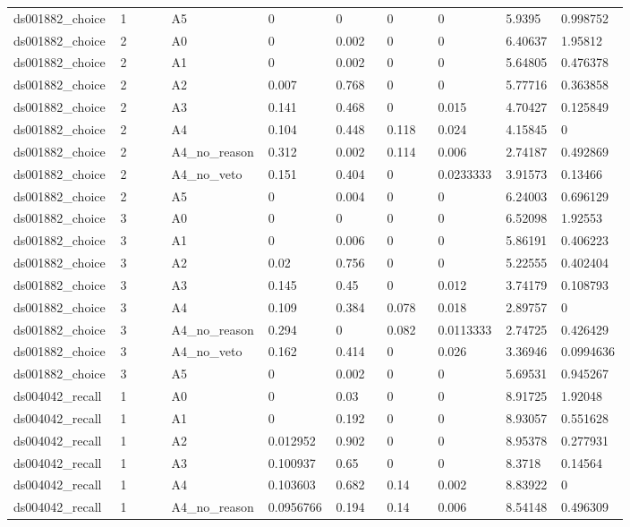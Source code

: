\documentclass[11pt]{article}
\begin{document}
\begin{landscape}
\begin{longtable}{@{}L{0.120\linewidth}L{0.085\linewidth}L{0.085\linewidth}L{0.085\linewidth}L{0.085\linewidth}L{0.085\linewidth}L{0.085\linewidth}L{0.085\linewidth}L{0.085\linewidth}@{}}
ds001882\_choice & 1 & A5 & 0 & 0 & 0 & 0 & 5.9395 & 0.998752 \\
ds001882\_choice & 2 & A0 & 0 & 0.002 & 0 & 0 & 6.40637 & 1.95812 \\
ds001882\_choice & 2 & A1 & 0 & 0.002 & 0 & 0 & 5.64805 & 0.476378 \\
ds001882\_choice & 2 & A2 & 0.007 & 0.768 & 0 & 0 & 5.77716 & 0.363858 \\
ds001882\_choice & 2 & A3 & 0.141 & 0.468 & 0 & 0.015 & 4.70427 & 0.125849 \\
ds001882\_choice & 2 & A4 & 0.104 & 0.448 & 0.118 & 0.024 & 4.15845 & 0 \\
ds001882\_choice & 2 & A4\_no\_reason & 0.312 & 0.002 & 0.114 & 0.006 & 2.74187 & 0.492869 \\
ds001882\_choice & 2 & A4\_no\_veto & 0.151 & 0.404 & 0 & 0.0233333 & 3.91573 & 0.13466 \\
ds001882\_choice & 2 & A5 & 0 & 0.004 & 0 & 0 & 6.24003 & 0.696129 \\
ds001882\_choice & 3 & A0 & 0 & 0 & 0 & 0 & 6.52098 & 1.92553 \\
ds001882\_choice & 3 & A1 & 0 & 0.006 & 0 & 0 & 5.86191 & 0.406223 \\
ds001882\_choice & 3 & A2 & 0.02 & 0.756 & 0 & 0 & 5.22555 & 0.402404 \\
ds001882\_choice & 3 & A3 & 0.145 & 0.45 & 0 & 0.012 & 3.74179 & 0.108793 \\
ds001882\_choice & 3 & A4 & 0.109 & 0.384 & 0.078 & 0.018 & 2.89757 & 0 \\
ds001882\_choice & 3 & A4\_no\_reason & 0.294 & 0 & 0.082 & 0.0113333 & 2.74725 & 0.426429 \\
ds001882\_choice & 3 & A4\_no\_veto & 0.162 & 0.414 & 0 & 0.026 & 3.36946 & 0.0994636 \\
ds001882\_choice & 3 & A5 & 0 & 0.002 & 0 & 0 & 5.69531 & 0.945267 \\
ds004042\_recall & 1 & A0 & 0 & 0.03 & 0 & 0 & 8.91725 & 1.92048 \\
ds004042\_recall & 1 & A1 & 0 & 0.192 & 0 & 0 & 8.93057 & 0.551628 \\
ds004042\_recall & 1 & A2 & 0.012952 & 0.902 & 0 & 0 & 8.95378 & 0.277931 \\
ds004042\_recall & 1 & A3 & 0.100937 & 0.65 & 0 & 0 & 8.3718 & 0.14564 \\
ds004042\_recall & 1 & A4 & 0.103603 & 0.682 & 0.14 & 0.002 & 8.83922 & 0 \\
ds004042\_recall & 1 & A4\_no\_reason & 0.0956766 & 0.194 & 0.14 & 0.006 & 8.54148 & 0.496309 \\

\end{longtable}
\end{landscape}
\end{document}
